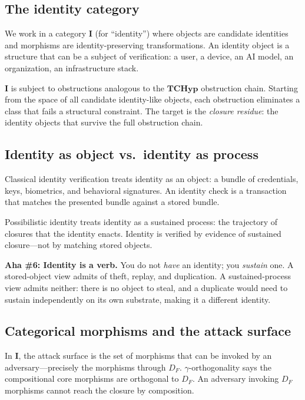\documentclass[11pt,a4paper]{article}
\theoremstyle{definition}
\theoremstyle{remark}
\newcommand{\aha}[2]{\medskip\textbf{Aha \##1: #2}}
\begin{document}
\subsection{The identity category}

We work in a category $\mathbf{I}$ (for ``identity'') where objects are candidate identities and morphisms are identity-preserving transformations. An identity object is a structure that can be a subject of verification: a user, a device, an AI model, an organization, an infrastructure stack.

$\mathbf{I}$ is subject to obstructions analogous to the $\mathbf{TCHyp}$ obstruction chain. Starting from the space of all candidate identity-like objects, each obstruction eliminates a class that fails a structural constraint. The target is the \emph{closure residue}: the identity objects that survive the full obstruction chain.

\subsection{Identity as object vs.\ identity as process}

Classical identity verification treats identity as an object: a bundle of credentials, keys, biometrics, and behavioral signatures. An identity check is a transaction that matches the presented bundle against a stored bundle.

Possibilistic identity treats identity as a sustained process: the trajectory of closures that the identity enacts. Identity is verified by evidence of sustained closure---not by matching stored objects.

\aha{6}{Identity is a verb.} You do not \emph{have} an identity; you \emph{sustain} one. A stored-object view admits of theft, replay, and duplication. A sustained-process view admits neither: there is no object to steal, and a duplicate would need to sustain independently on its own substrate, making it a different identity.

\subsection{Categorical morphisms and the attack surface}

In $\mathbf{I}$, the attack surface is the set of morphisms that can be invoked by an adversary---precisely the morphisms through $D_F$. $\gamma$-orthogonality says the compositional core morphisms are orthogonal to $D_F$. An adversary invoking $D_F$ morphisms cannot reach the closure by composition.
\end{document}
